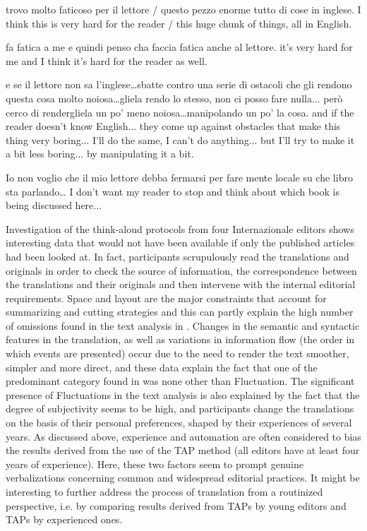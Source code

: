 \documentclass[output=paper]{LSP/langsci}
\begin{document}
\ea \label{troqe-marchan:ex:34}
\glt trovo molto faticoso per il lettore / questo pezzo enorme tutto di cose in inglese.
\glt I think this is very hard for the reader / this huge chunk of things, all in English.
\z 

\ea \label{troqe-marchan:ex:35} 
\glt fa fatica a me e quindi penso cha faccia fatica anche al lettore.
\glt it's very hard for me and I think it's hard for the reader as well. 
\z 

\ea \label{troqe-marchan:ex:36} 
\glt e se il lettore non sa l'inglese\ldots  sbatte contro una serie di ostacoli che gli rendono questa cosa molto noiosa\ldots  gliela rendo lo stesso, non ci posso fare nulla... però cerco di rendergliela un po' meno noiosa\ldots  manipolando un po' la cosa.
\glt and if the reader doesn't know English... they come up against obstacles that make this thing very boring... I'll do the same, I can't do anything... but I'll try to make it a bit less boring... by manipulating it a bit.
\z 

\ea \label{troqe-marchan:ex:37} 
\glt Io non voglio che il mio lettore debba fermarsi per fare mente locale su che libro sta parlando\ldots  
\glt I don't want my reader to stop and think about which book is being discussed here...
\z 

Investigation of the think-aloud protocols from four Internazionale editors shows interesting data that would not have been available if only the published articles had been looked at. In fact, participants scrupulously read the translations and originals in order to check the source of information,  the correspondence between the translations and their originals and then intervene with the internal editorial requirements. Space and layout are the major constraints that account for summarizing and cutting strategies and this can partly explain the high number of omissions found in the text analysis in . Changes in the semantic and syntactic features in the translation, as well as variations in information flow (the order in which events are presented) occur due to the need to render the text smoother, simpler and more %
direct, and these data explain the fact that one of the predominant category found in  was none other than Fluctuation. The significant presence of Fluctuations in the text analysis is also explained by the fact that the degree of subjectivity seems to be high, and participants change the translations on the basis of their personal preferences, shaped by their experiences of several years. As discussed above, experience and automation are often considered to bias the results derived from the use of the TAP method (all editors have at least four years of experience). Here, these two factors seem to prompt genuine verbalizations concerning common and widespread editorial practices. It might be interesting to further address the process of translation  from a routinized perspective, i.e. by comparing results derived from TAPs by young editors and TAPs by experienced ones. 
\end{document}
